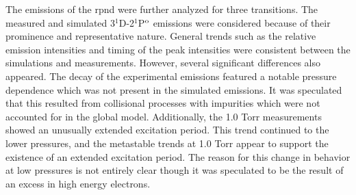 The emissions of the \acs{rpnd} were further analyzed for three transitions. The
measured and simulated 3$^1$D-2$^1$P$^\mathrm{o}$ emissions were considered because of
their prominence and representative nature. General trends such as the relative
emission intensities and timing of the peak intensities were consistent between
the simulations and measurements. However, several significant differences also
appeared. The decay of the experimental emissions featured a notable pressure
dependence which was not present in the simulated emissions. It was speculated
that this resulted from collisional processes with impurities which were not
accounted for in the global model. Additionally, the 1.0 Torr measurements
showed an unusually extended excitation period. This trend continued to the
lower pressures, and the metastable trends at 1.0 Torr appear to support the
existence of an extended excitation period. The reason for this change in
behavior at low pressures is not entirely clear though it was speculated to be
the result of an excess in high energy electrons.
